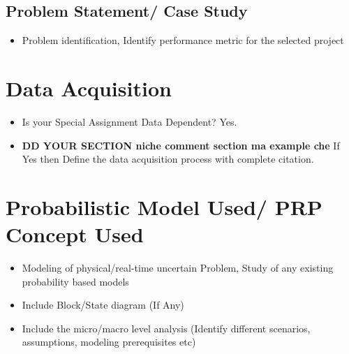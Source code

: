 \documentclass{article}
\begin{document}
\subsection{Problem Statement/ Case Study}


\begin{itemize}
    \item Problem identification, Identify  performance metric for the selected project %

\end{itemize}

\section{Data Acquisition }

\begin{itemize}
    \item Is your Special Assignment Data Dependent? Yes.

    \item \textbf{DD YOUR SECTION niche comment section ma example che}
    If Yes then Define the data acquisition process with complete citation.
\end{itemize}
\section {Probabilistic Model Used/ PRP Concept Used}
\begin{itemize}

\item Modeling of physical/real-time uncertain Problem, Study of any existing probability based models
\item Include Block/State diagram (If Any)
\item Include the micro/macro level analysis (Identify different scenarios, assumptions, modeling prerequisites etc)
\end{itemize}
\end{document}
